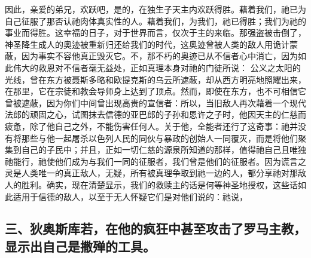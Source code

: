 因此，亲爱的弟兄，欢跃吧，是的，在独生子天主内欢跃得胜。藉着我们，祂已为自己征服了那否认祂肉体真实性的人。藉着我们，为我们，祂已得胜；我们为祂的事业而得胜。这幸福的日子，对于世界而言，仅次于主的来临。那强盗被击倒了，神圣降生成人的奥迹被重新归还给我们的时代，这奥迹曾被人类的敌人用诡计蒙蔽，因为事实不容他真正毁灭它。不，那不朽的奥迹已从不信者心中消亡，因为如此伟大的救恩对不信者毫无益处，正如真理本身对祂的门徒所说： 公义之太阳的光线，曾在东方被聂斯多略和欧提克斯的乌云所遮蔽，却从西方明亮地照耀出来，在那里，它在宗徒和教会导师身上达到了顶点。然而，即使在东方，也不可相信它曾被遮蔽，因为你们中间曾出现高贵的宣信者：所以，当旧敌人再次藉着一个现代法郎的顽固之心，试图抹去信德的亚巴郎的子孙和恩许之子时，他因天主的仁慈而疲惫，除了他自己之外，不能伤害任何人。关于他，全能者还行了这奇事：祂并没有将那些与他一起屠杀以色列人民的同伙与暴政的创始人一同覆灭，而是将他们聚集到自己的子民中；并且，正如一切仁慈的源泉所知道的那样，值得祂自己且唯独祂能行，祂使他们成为与我们一同的征服者，我们曾是他们的征服者。因为谎言之灵是人类唯一的真正敌人，无疑，所有被真理争取到祂一边的人，都分享祂对那敌人的胜利。确实，现在清楚显示，我们的救赎主的话是何等神圣地授权，这些话如此适用于信德的敌人，以至于无人怀疑它们是对他们说的：祂说，\par


\subsection{三、狄奥斯库若，在他的疯狂中甚至攻击了罗马主教，显示出自己是撒殚的工具。}

